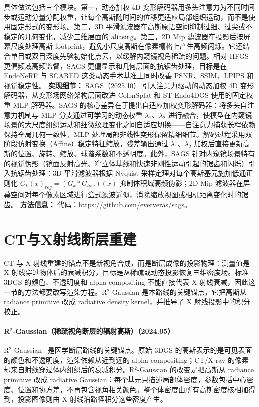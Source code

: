 具体做法包括三个模块。第一，动态加权 4D 变形解码器用多头注意力为不同时间步或运动分量分配权重，让每个高斯随时间的位移更适应局部组织运动，而不是使用固定形式的变形场。第二，3D 平滑滤波器在高斯原语空间抑制过细、过尖或不稳定的几何变化，减少三维层面的 aliasing。第三，2D Mip 滤波器在投影后按屏幕尺度处理高斯 footprint，避免小尺度高斯在像素栅格上产生高频闪烁。它还结合单目或双目深度先验初始化点云，以缓解内窥镜视角稀疏的问题。相对 HFGS 更偏频域高频监督，SAGS 更偏显示和几何层面的抗锯齿处理，目标是在 EndoNeRF 与 SCARED 这类动态手术基准上同时改善 PSNR、SSIM、LPIPS 和视觉稳定性。
\textbf{实现细节：} SAGS（2025.10） 引入注意力驱动的动态加权 4D 变形解码器，从变形场网络架构层面改进 ColonSplat 和 ST-Endo4DGS 使用的固定权重 MLP 解码器。SAGS 的核心差异在于提出自适应加权变形解码器：将多头自注意力机制与 MLP 分支通过可学习的动态权重 $\lambda_1$、$\lambda_2$ 进行融合，使模型在内窥镜场景的大尺度组织运动和细微纹理变化之间自适应切换——自注意力捕获长程依赖保持全局几何一致性，MLP 处理局部非线性变形保留精细细节。解码过程采用双阶段仿射变换（Affine）稳定特征缩放，残差输出通过 $\lambda_1$、$\lambda_2$ 加权后直接更新高斯的位置、旋转、缩放、球谐系数和不透明度。此外，SAGS 针对内窥镜场景特有的视觉伪影（镜面反射高光、窄立体基线和快速非刚性运动引起的锯齿和闪烁）引入抗锯齿处理：3D 平滑滤波器根据 Nyquist 采样定理对每个高斯基元施加低通正则化 $G_k(x)_{reg} = (G_k * G_{low})(x)$ 抑制体积域高频伪影；2D Mip 滤波器在屏幕空间对每个像素区域进行盒式滤波近似，消除缩放视图或相机距离变化时的锯齿。
\textbf{方法信息：} 代码：\url{https://github.com/eververas/sags}。



\section{CT与X射线断层重建}

CT 与 X 射线重建的锚点不是新视角合成，而是断层成像的投影物理：测量值是 X 射线穿过物体后的衰减积分，目标是从稀疏或动态投影恢复三维密度场。标准 3DGS 的颜色、不透明度和 alpha compositing 不能直接代表 X 射线衰减，因此这一节的方法都要改写渲染方程。R$^2$-Gaussian 是本路线的关键锚点，它把高斯从 radiance primitive 改成 radiative density kernel，并推导了 X 射线投影中的积分校正。


\paragraph{R$^2$-Gaussian（稀疏视角断层的辐射高斯）（2024.05）}
R$^2$-Gaussian~\cite{2405_20693} 是医学断层路线的关键锚点。原始 3DGS 的高斯表示的是可见表面的颜色和不透明度，渲染依赖从近到远的 alpha compositing；CT/X-ray 的像素却来自射线穿过体内组织后的衰减积分。R$^2$-Gaussian 的改变是把高斯从 radiance primitive 改成 radiative Gaussian：每个基元只描述局部体密度，参数包括中心密度、位置和协方差，不再包含视角相关颜色。整个体密度由所有高斯密度核相加得到，投影图像则由 X 射线沿路径积分这些密度产生。

